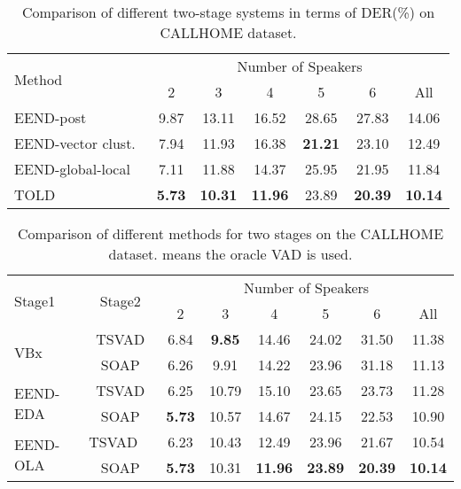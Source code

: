 \documentclass{article}
\begin{document}
\begin{table}[t!]
  \caption{Comparison of different two-stage systems in terms of DER(\%) on CALLHOME dataset.}
  \vspace{0.1cm}
  \label{tab:hybrid_callhome_der}
  \centering
  \setlength\tabcolsep{2.5pt}
  \begin{tabular}{l c c c c c c}
    \toprule 
    \multirow{2}{*}{Method} & \multicolumn{6}{c}{Number of Speakers}  \\
    \cmidrule(lr){2-7}
    & 2  & 3 & 4 & 5 & 6 & All \\
    \midrule
    EEND-post~\cite{EEND-post}                       & 9.87    & 13.11	& 16.52	& 28.65	& 27.83	& 14.06    \\
    EEND-vector clust.~\cite{EEND-vector-clust}                 & 7.94    & 11.93	& 16.38	& \textbf{21.21}	& 23.10	& 12.49    \\
    EEND-global-local~\cite{EEND-global-local}               & 7.11    & 11.88	& 14.37	& 25.95	& 21.95	& 11.84    \\
    \midrule
    TOLD                  & \textbf{5.73}	    & \textbf{10.31}	& \textbf{11.96}	& 23.89	& \textbf{20.39}	& \textbf{10.14}    \\
    \bottomrule
  \end{tabular}
  \vspace{-0.1cm}
\end{table}

\begin{table}[t!]
  \vspace{-0.2cm}
  \caption{Comparison of different methods for two stages on the CALLHOME dataset.  means the oracle VAD is used.}
  \vspace{0.1cm}
  \label{tab:callhome_der_compare}
  \centering
  \setlength\tabcolsep{2.5pt}
  \begin{tabular}{l c c c c c c c}
    \toprule 
    \multirow{2}{*}{Stage1} & \multirow{2}{*}{Stage2} & \multicolumn{6}{c}{Number of Speakers}  \\
    \cmidrule(lr){3-8}
    & & 2 & 3 & 4 & 5 & 6 & All \\
    \midrule
    \multirow{2}{*}{VBx}  & TSVAD         & 6.84    & \textbf{9.85}    & 14.46   & 24.02 & 31.50 & 11.38    \\
      & SOAP          & 6.26    & 9.91    & 14.22  & 23.96 & 31.18 & 11.13    \\
    \midrule
    \multirow{2}{*}{EEND-EDA}  & TSVAD    & 6.25	  & 10.79   & 15.10   & 23.65 & 23.73 & 11.28    \\
& SOAP & \textbf{5.73} & 10.57 & 14.67 & 24.15 & 22.53 & 10.90 \\
    \midrule
    \multirow{2}{*}{EEND-OLA}~~ & TSVAD~~    & 6.23 & 10.43 & 12.49 & 23.96 & 21.67 & 10.54 \\
    & SOAP & \textbf{5.73} & 10.31 & \textbf{11.96}   & \textbf{23.89} & \textbf{20.39} & \textbf{10.14}    \\
    \bottomrule
  \end{tabular}
  \vspace{-0.3cm}
\end{table}
\end{document}

